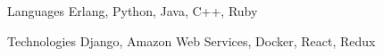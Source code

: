 
\begin{cvskills}
  \cvskill
    {Languages} %
    {Erlang, Python, Java, C++, Ruby} %

  \cvskill
    {Technologies} %
    {Django, Amazon Web Services, Docker, React, Redux} %
\end{cvskills}
